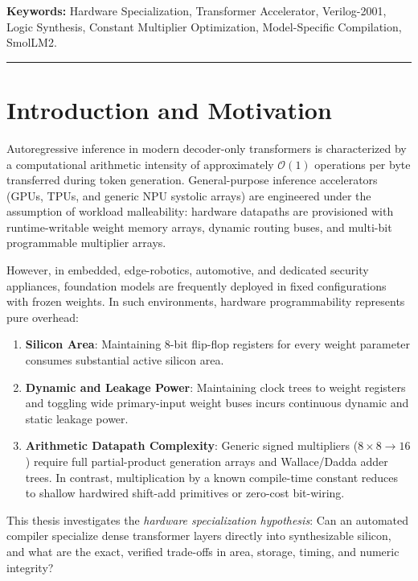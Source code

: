 \documentclass[11pt,a4paper]{article}
\begin{document}
\noindent\textbf{Keywords:} Hardware Specialization, Transformer Accelerator, Verilog-2001, Logic Synthesis, Constant Multiplier Optimization, Model-Specific Compilation, SmolLM2.

\vspace{0.4em}
\hrule
\vspace{1.0em}

\section{Introduction and Motivation}

Autoregressive inference in modern decoder-only transformers is characterized by a computational arithmetic intensity of approximately $\mathcal{O}(1)$ operations per byte transferred during token generation. General-purpose inference accelerators (GPUs, TPUs, and generic NPU systolic arrays) are engineered under the assumption of workload malleability: hardware datapaths are provisioned with runtime-writable weight memory arrays, dynamic routing buses, and multi-bit programmable multiplier arrays.

However, in embedded, edge-robotics, automotive, and dedicated security appliances, foundation models are frequently deployed in fixed configurations with frozen weights. In such environments, hardware programmability represents pure overhead:
\begin{enumerate}
    \item \textbf{Silicon Area}: Maintaining 8-bit flip-flop registers for every weight parameter consumes substantial active silicon area.
    \item \textbf{Dynamic and Leakage Power}: Maintaining clock trees to weight registers and toggling wide primary-input weight buses incurs continuous dynamic and static leakage power.
    \item \textbf{Arithmetic Datapath Complexity}: Generic signed multipliers ($8 \times 8 \to 16$) require full partial-product generation arrays and Wallace/Dadda adder trees. In contrast, multiplication by a known compile-time constant reduces to shallow hardwired shift-add primitives or zero-cost bit-wiring.
\end{enumerate}

This thesis investigates the \textit{hardware specialization hypothesis}: Can an automated compiler specialize dense transformer layers directly into synthesizable silicon, and what are the exact, verified trade-offs in area, storage, timing, and numeric integrity?
\end{document}
